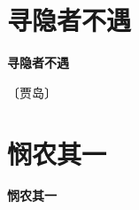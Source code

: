 \documentclass[12pt,UTF-8,openany,fontset=none]{ctexbook}
\begin{document}
\vspace{8pt}
\clearpage


\section{寻隐者不遇}



\begin{center}
    {\bfseries 寻隐者不遇}
\end{center}

\begin{center}
    \vspace{10pt}
    
    \begin{large}
        
        〔贾岛〕
        
    \end{large}
    
    \vspace{8pt}
    
    \begin{huge}
        
        \phantom{。}

        \phantom{。}
        
        \phantom{。}

        \phantom{。}
        
    \end{huge}
    
\end{center}

\vspace{8pt}
\clearpage


\section{悯农其一}



\begin{center}
    {\bfseries 悯农其一}
\end{center}
\end{document}
